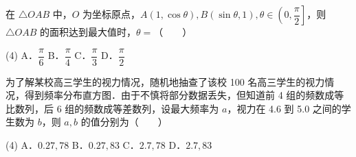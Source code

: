 \begin{question}
在 $\triangle OAB$ 中，$O$ 为坐标原点，$A(1, \cos\theta), B(\sin\theta, 1), \theta \in \left(0, \dfrac{\pi}{2}\right]$，则 $\triangle OAB$ 的面积达到最大值时，$\theta =$\mbox{（　　）}

\begin{gkopts}(4)
\task A．$\dfrac{\pi}{6}$
\task B．$\dfrac{\pi}{4}$
\task C．$\dfrac{\pi}{3}$
\task D．$\dfrac{\pi}{2}$
\end{gkopts}

\Needspace{0.4\textheight}
\end{question}
\begin{question}
为了解某校高三学生的视力情况，随机地抽查了该校 100 名高三学生的视力情况，得到频率分布直方图．由于不慎将部分数据丢失，但知道前 4 组的频数成等比数列，后 6 组的频数成等差数列，设最大频率为 $a$，视力在 4.6 到 5.0 之间的学生数为 $b$，则 $a, b$ 的值分别为\mbox{（　　）}

\begin{gkopts}(4)
\task A．$0.27, 78$
\task B．$0.27, 83$
\task C．$2.7, 78$
\task D．$2.7, 83$
\end{gkopts}
\nopagebreak[4]
\begin{center}\end{center}
\nopagebreak[4]
\end{question}

